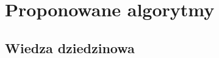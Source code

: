 %
\chapter{Proponowane algorytmy}
\label{sec:proponowane_algorytmy}

\section{Wiedza dziedzinowa}
\label{sec:proponowane_algorytmy:wiedza_dziedzinowa}